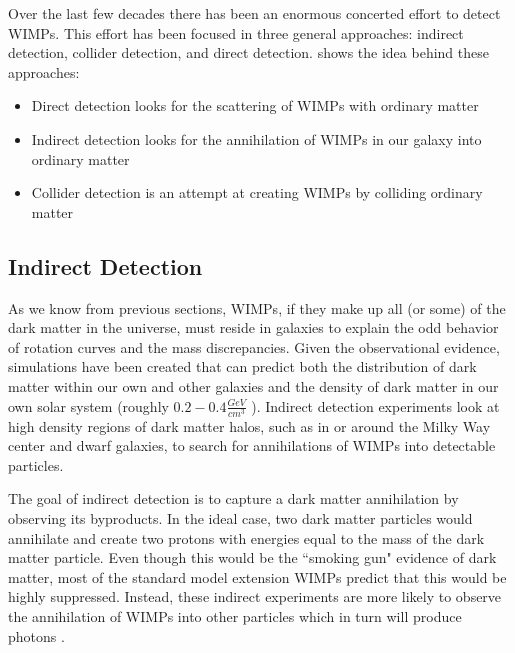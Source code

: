 Over the last few decades there has been an enormous concerted effort to detect WIMPs.  This effort has been focused in three general approaches: indirect detection, collider detection, and direct detection.   shows the idea behind these approaches:

\begin{itemize}
        \item Direct detection looks for the scattering of WIMPs with ordinary matter
        \item Indirect detection looks for the annihilation of WIMPs in our galaxy into ordinary matter
        \item Collider detection is an attempt at creating WIMPs by colliding ordinary matter
\end{itemize}


\subsection{Indirect Detection}
\label{sec:indirect_detection}

As we know from previous sections, WIMPs, if they make up all (or some) of the dark matter in the universe, must reside in galaxies to explain the odd behavior of rotation curves and the mass discrepancies.  Given the observational evidence, simulations have been created that can predict both the distribution of dark matter within our own and other galaxies \cite{stadel2009quantifying, maccio2007concentration} and the density of dark matter in our own solar system (roughly $0.2 - 0.4 \frac{GeV}{cm^3}$ \cite{read2014local}).  Indirect detection experiments look at high density regions of dark matter halos, such as in or around the Milky Way center and dwarf galaxies, to search for annihilations of WIMPs into detectable particles.

The goal of indirect detection is to capture a dark matter annihilation by observing its byproducts.  In the ideal case, two dark matter particles would annihilate and create two protons with energies equal to the mass of the dark matter particle.  Even though this would be the ``smoking gun" evidence of dark matter, most of the standard model extension WIMPs predict that this would be highly suppressed.  Instead, these indirect experiments are more likely to observe the annihilation of WIMPs into other particles which in turn will produce photons \cite{bi2013status}.  

